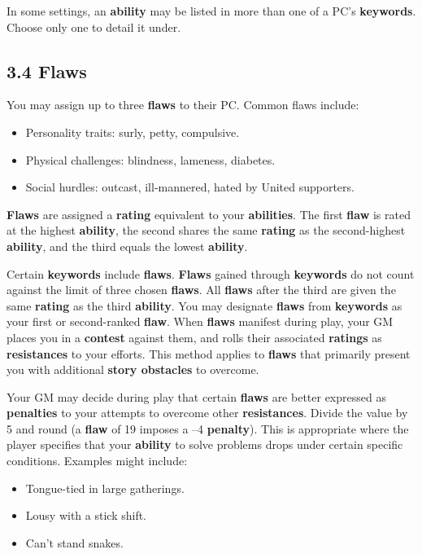 \documentclass[
]{article}
\providecommand{\tightlist}{%
  \setlength{\itemsep}{0pt}\setlength{\parskip}{0pt}}
\begin{document}
In some settings, an \textbf{ability} may be listed in more than one of
a PC's \textbf{keywords}. Choose only one to detail it under.

\hypertarget{flaws}{%
\subsection{3.4 Flaws}\label{flaws}}

You may assign up to three \textbf{flaws} to their PC. Common flaws
include:

\begin{itemize}
\tightlist
\item
  Personality traits: surly, petty, compulsive.
\item
  Physical challenges: blindness, lameness, diabetes.
\item
  Social hurdles: outcast, ill-mannered, hated by United supporters.
\end{itemize}

\textbf{Flaws} are assigned a \textbf{rating} equivalent to your
\textbf{abilities}. The first \textbf{flaw} is rated at the highest
\textbf{ability}, the second shares the same \textbf{rating} as the
second-highest \textbf{ability}, and the third equals the lowest
\textbf{ability}.

Certain \textbf{keywords} include \textbf{flaws}. \textbf{Flaws} gained
through \textbf{keywords} do not count against the limit of three chosen
\textbf{flaws}. All \textbf{flaws} after the third are given the same
\textbf{rating} as the third \textbf{ability}. You may designate
\textbf{flaws} from \textbf{keywords} as your first or second-ranked
\textbf{flaw}. When \textbf{flaws} manifest during play, your GM places
you in a \textbf{contest} against them, and rolls their associated
\textbf{ratings} as \textbf{resistances} to your efforts. This method
applies to \textbf{flaws} that primarily present you with additional
\textbf{story obstacles} to overcome.

Your GM may decide during play that certain \textbf{flaws} are better
expressed as \textbf{penalties} to your attempts to overcome other
\textbf{resistances}. Divide the value by 5 and round (a \textbf{flaw}
of 19 imposes a --4 \textbf{penalty}). This is appropriate where the
player specifies that your \textbf{ability} to solve problems drops
under certain specific conditions. Examples might include:

\begin{itemize}
\tightlist
\item
  Tongue-tied in large gatherings.
\item
  Lousy with a stick shift.
\item
  Can't stand snakes.
\end{itemize}
\end{document}
